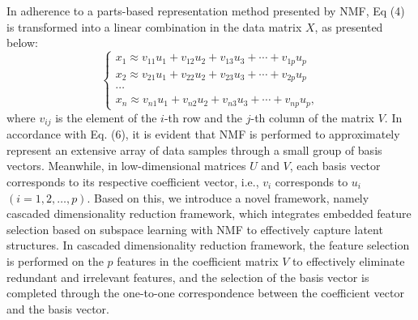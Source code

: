 \documentclass[a4paper,fleqn]{cas-sc}
\begin{document}
In adherence to a parts-based representation method presented by NMF, Eq  (4) is transformed into a linear combination in the data matrix $X$, as presented below:
\begin{equation}
	\left\{\begin{array}{c}
		x_1 \approx v_{11} u_1+v_{12} u_2+v_{13} u_3+\cdots+v_{1 p} u_p \\
		x_2 \approx v_{21} u_1+v_{22} u_2+v_{23} u_3+\cdots+v_{2 p} u_p \\
		\cdots \\
		x_n \approx v_{n 1} u_1+v_{n 2} u_2+v_{n 3} u_3+\cdots+v_{n p} u_p,
	\end{array}\right.
\end{equation}
where $v_{i j}$ is the element of the $i$-th row and the $j$-th column of the matrix $V$. In accordance with Eq. (6), it is evident that NMF is  performed to approximately represent an extensive array of data samples through a small group of basis vectors. Meanwhile, in low-dimensional matrices $U$ and $V$, each basis vector corresponds to its respective coefficient vector, i.e., $v_i$ corresponds to $u_i$ $(i=1,  2, \ldots, p)$. Based on this,  we introduce a  novel  framework, namely  cascaded  dimensionality  reduction  framework,  which  integrates embedded feature  selection based on subspace learning  with  NMF  to  effectively  capture  latent  structures. In  cascaded dimensionality reduction framework, the feature selection is performed on the $p$ features in the coefficient matrix $V$ to effectively eliminate redundant and irrelevant features, and the selection of the basis vector is completed through the one-to-one correspondence between the coefficient vector and the basis vector.
\end{document}
